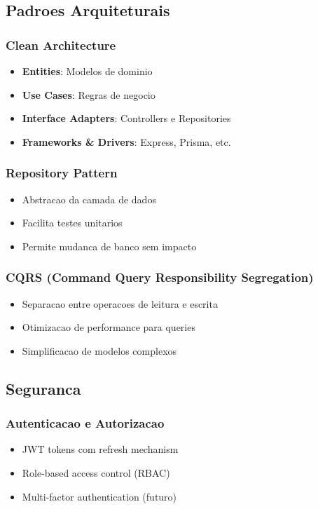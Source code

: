 \subsection{Padroes Arquiteturais}

\subsubsection{Clean Architecture}
\begin{itemize}
    \item \textbf{Entities}: Modelos de dominio
    \item \textbf{Use Cases}: Regras de negocio
    \item \textbf{Interface Adapters}: Controllers e Repositories
    \item \textbf{Frameworks \& Drivers}: Express, Prisma, etc.
\end{itemize}

\subsubsection{Repository Pattern}
\begin{itemize}
    \item Abstracao da camada de dados
    \item Facilita testes unitarios
    \item Permite mudanca de banco sem impacto
\end{itemize}

\subsubsection{CQRS (Command Query Responsibility Segregation)}
\begin{itemize}
    \item Separacao entre operacoes de leitura e escrita
    \item Otimizacao de performance para queries
    \item Simplificacao de modelos complexos
\end{itemize}

\subsection{Seguranca}

\subsubsection{Autenticacao e Autorizacao}
\begin{itemize}
    \item JWT tokens com refresh mechanism
    \item Role-based access control (RBAC)
    \item Multi-factor authentication (futuro)
\end{itemize}

